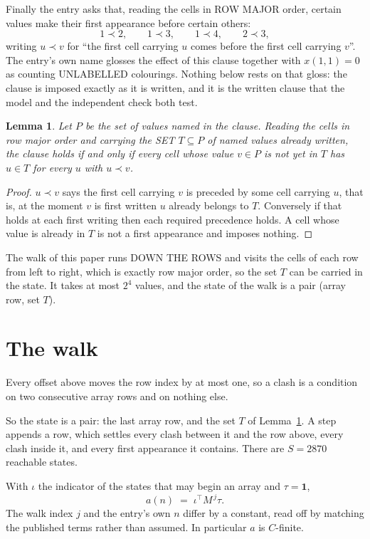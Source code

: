 \documentclass[11pt,a4paper]{article}
\theoremstyle{plain}
\newtheorem{lemma}[theorem]{Lemma}
\theoremstyle{definition}
\begin{document}
Finally the entry asks that, reading the cells in ROW MAJOR order, certain values make their
first appearance before certain others:
\[
1\prec 2,\qquad 1\prec 3,\qquad 1\prec 4,\qquad 2\prec 3 ,
\]
writing $u\prec v$ for ``the first cell carrying $u$ comes before the first cell carrying
$v$''. The entry's own name glosses the effect of this clause together with $x(1,1)=0$ as
counting UNLABELLED colourings. Nothing below rests on that gloss: the clause is imposed
exactly as it is written, and it is the written clause that the model and the independent
check both test.

\begin{lemma}\label{lem:seen}
Let $P$ be the set of values named in the clause. Reading the cells in row major order and
carrying the SET $T\subseteq P$ of named values already written, the clause holds if and only
if every cell whose value $v\in P$ is not yet in $T$ has $u\in T$ for every $u$ with $u\prec v$.
\end{lemma}

\begin{proof}
$u\prec v$ says the first cell carrying $v$ is preceded by some cell carrying $u$, that is, at
the moment $v$ is first written $u$ already belongs to $T$. Conversely if that holds at each
first writing then each required precedence holds. A cell whose value is already in $T$ is not
a first appearance and imposes nothing.
\end{proof}

The walk of this paper runs DOWN THE ROWS and visits the cells of each row from left to right,
which is exactly row major order, so the set $T$ can be carried in the state. It takes at most
$2^{4}$ values, and the state of the walk is a pair (array row, set $T$).

\section{The walk}

Every offset above moves the row index by at most one, so a clash is a condition on two
consecutive array rows and on nothing else.

So the state is a pair: the last array row, and the set $T$ of Lemma~\ref{lem:seen}. A step
appends a row, which settles every clash between it and the row above, every clash inside it,
and every first appearance it contains. There are $S=2870$ reachable states.

With $\iota$ the indicator of the states that may begin an array and $\tau=\mathbf{1}$,
\[
a(n)\;=\;\iota^{\!\top}M^{\,j}\tau .
\]
The walk index $j$ and the entry's own $n$ differ by a constant, read off by matching the
published terms rather than assumed. In particular $a$ is $C$-finite.
\end{document}
